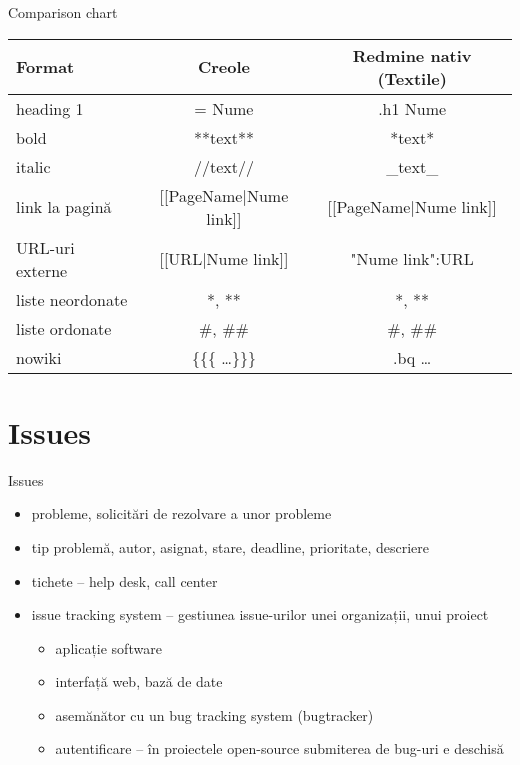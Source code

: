 \documentclass{beamer}
\begin{document}
\begin{frame}{Comparison chart}
  \begin{center}
    \begin{tabular}{@{}lcc@{}}
      \toprule
      \textbf{Format} & \textbf{Creole} & \textbf{Redmine nativ (Textile)} \\
      \midrule
      heading 1 & = Nume & .h1 Nume \\
      bold & **text** & *text* \\
      italic & //text// & \_text\_ \\
      link la pagină & [[PageName$|$Nume link]] & [[PageName$|$Nume link]] \\
      URL-uri externe & [[URL$|$Nume link]] & "Nume link":URL \\
      liste neordonate & *, ** & *, ** \\
      liste ordonate & \#, \#\# & \#, \#\# \\
      nowiki & \{\{\{ \ldots \}\}\} & .bq \ldots \\
      \bottomrule
    \end{tabular}
  \end{center}
\end{frame}

\section{Issues}

\begin{frame}{Issues}
  \begin{itemize}
    \item probleme, solicitări de rezolvare a unor probleme
    \item tip problemă, autor, asignat, stare, deadline, prioritate,
descriere
    \item tichete -- help desk, call center
    \item issue tracking system -- gestiunea issue-urilor unei
organizații, unui proiect
      \begin{itemize}
        \item aplicație software
        \item interfață web, bază de date
        \item asemănător cu un bug tracking system (bugtracker)
        \item autentificare -- în proiectele open-source submiterea de
bug-uri e deschisă
      \end{itemize}
  \end{itemize}
\end{frame}
\end{document}
